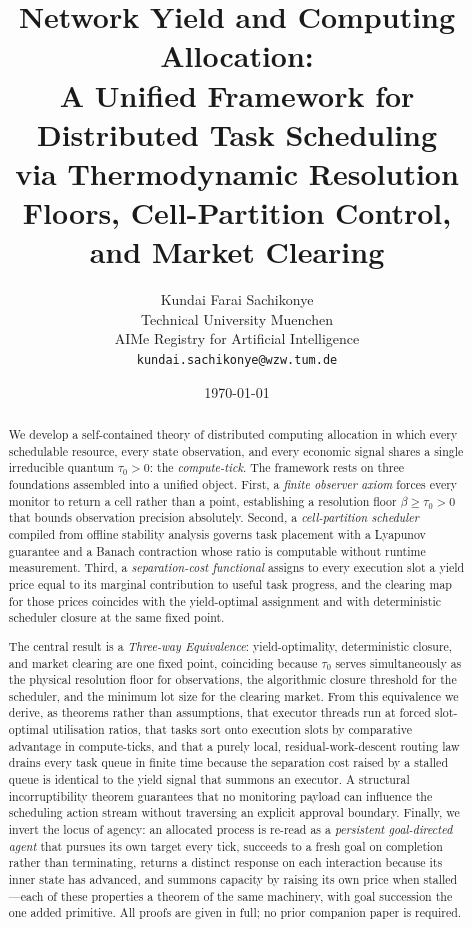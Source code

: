 \documentclass[11pt,twocolumn,a4paper]{article}
\title{\textbf{Network Yield and Computing Allocation:\\
A Unified Framework for Distributed Task Scheduling\\
via Thermodynamic Resolution Floors, Cell-Partition Control,\\
and Market Clearing}}
\author{Kundai Farai Sachikonye\\[2pt]
\small Technical University Muenchen\\
\small AIMe Registry for Artificial Intelligence\\
\small \texttt{kundai.sachikonye@wzw.tum.de}}
\date{\today}
\theoremstyle{plain}
\theoremstyle{definition}
\theoremstyle{remark}
\newcommand{\tick}{\tau_0}
\newcommand{\floor}{\beta}
\begin{document}
\maketitle

\begin{abstract}
We develop a self-contained theory of distributed computing allocation in which every schedulable resource, every state observation, and every economic signal shares a single irreducible quantum $\tick > 0$: the \emph{compute-tick}. The framework rests on three foundations assembled into a unified object. First, a \emph{finite observer axiom} forces every monitor to return a cell rather than a point, establishing a resolution floor $\floor \geq \tick > 0$ that bounds observation precision absolutely. Second, a \emph{cell-partition scheduler} compiled from offline stability analysis governs task placement with a Lyapunov guarantee and a Banach contraction whose ratio is computable without runtime measurement. Third, a \emph{separation-cost functional} assigns to every execution slot a yield price equal to its marginal contribution to useful task progress, and the clearing map for those prices coincides with the yield-optimal assignment and with deterministic scheduler closure at the same fixed point.

The central result is a \emph{Three-way Equivalence}: yield-optimality, deterministic closure, and market clearing are one fixed point, coinciding because $\tick$ serves simultaneously as the physical resolution floor for observations, the algorithmic closure threshold for the scheduler, and the minimum lot size for the clearing market. From this equivalence we derive, as theorems rather than assumptions, that executor threads run at forced slot-optimal utilisation ratios, that tasks sort onto execution slots by comparative advantage in compute-ticks, and that a purely local, residual-work-descent routing law drains every task queue in finite time because the separation cost raised by a stalled queue is identical to the yield signal that summons an executor. A structural incorruptibility theorem guarantees that no monitoring payload can influence the scheduling action stream without traversing an explicit approval boundary. Finally, we invert the locus of agency: an allocated process is re-read as a \emph{persistent goal-directed agent} that pursues its own target every tick, succeeds to a fresh goal on completion rather than terminating, returns a distinct response on each interaction because its inner state has advanced, and summons capacity by raising its own price when stalled---each of these properties a theorem of the same machinery, with goal succession the one added primitive. All proofs are given in full; no prior companion paper is required.
\end{abstract}
\end{document}
